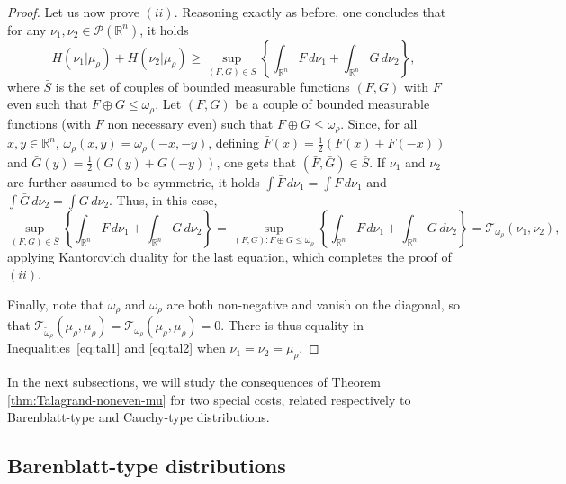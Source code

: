 \documentclass[10pt]{amsart}
\theoremstyle{definition}
\theoremstyle{remark}
\newcommand{\R}{\mathbb{R}}
\begin{document}
\begin{proof}
Let us now prove $(ii)$. Reasoning exactly as before, one concludes that for any $\nu_1,\nu_2 \in \mathcal{P}(\R^n)$, it holds 
\[
    H(\nu_1|  \mu_\rho) + H(\nu_2|  \mu_\rho) \geq  \sup_{(F,G)\in \bar{S}}\left\{ \int_{\R^n} F\,d\nu_1 + \int_{\R^n} G\,d\nu_2\right\},
\]
where $\bar{S}$ is the set of couples of bounded measurable functions $(F,G)$ with $F$ even such that $F\oplus G \leq \omega_\rho$.
Let $(F,G)$ be a couple of bounded measurable functions (with $F$ non necessary even) such that $F \oplus G \leq \omega_\rho$. Since, for all $x,y \in \R^n$, $\omega_\rho(x,y) = \omega_\rho(-x,-y)$, defining $\bar{F}(x)=\frac{1}{2}(F(x)+F(-x))$ and $\bar{G}(y) = \frac{1}{2}(G(y)+G(-y))$, one gets that $(\bar{F},\bar{G}) \in \bar{S}$. If $\nu_1$ and $\nu_2$ are further assumed to be symmetric, it holds $\int \bar{F}\,d\nu_1 = \int F\,d\nu_1$ and $\int \bar{G}\,d\nu_2 = \int G\,d\nu_2$. Thus, in this case, 
\[
 \sup_{(F,G)\in \bar{S}}\left\{ \int_{\R^n} F\,d\nu_1 + \int_{\R^n} G\,d\nu_2\right\} =  \sup_{(F,G) : F\oplus G \leq \omega_\rho}\left\{ \int_{\R^n} F\,d\nu_1 + \int_{\R^n} G\,d\nu_2\right\} = \mathcal{T}_{\omega_\rho} (\nu_1,\nu_2),
\]
applying Kantorovich duality for the last equation, which completes the proof of $(ii)$.


Finally, note that $\tilde{\omega}_\rho$ and $\omega_\rho$ are both non-negative and vanish on the diagonal, so that $\mathcal{T}_{\tilde{\omega}_\rho}(\mu_\rho,\mu_\rho) = \mathcal{T}_{\omega_\rho}(\mu_\rho,\mu_\rho)=0$. There is thus equality in Inequalities~\eqref{eq:tal1} and \eqref{eq:tal2} when $\nu_1=\nu_2=\mu_\rho$.
\end{proof}


In the next subsections, we will study the consequences of Theorem \ref{thm:Talagrand-noneven-mu} for two special costs, related respectively to Barenblatt-type and Cauchy-type distributions. 

\subsection{Barenblatt-type distributions}
\end{document}
